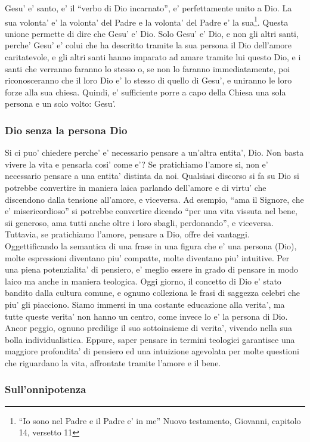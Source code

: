 Gesu' e' santo, e' il ``verbo di Dio incarnato'', e' perfettamente unito a Dio. La sua volonta' e' la volonta' del Padre e la volonta' del Padre e' la sua\footnote{``Io sono nel Padre e il Padre e' in me'' Nuovo testamento, Giovanni, capitolo 14, versetto 11}. Questa unione permette di dire che Gesu' e' Dio. Solo Gesu' e' Dio, e non gli altri santi, perche' Gesu' e' colui che ha descritto tramite la sua persona il Dio dell'amore caritatevole, e gli altri santi hanno imparato ad amare tramite lui questo Dio, e i santi che verranno faranno lo stesso o, se non lo faranno immediatamente, poi riconosceranno che il loro Dio e' lo stesso di quello di Gesu', e uniranno le loro forze alla sua chiesa. Quindi, e' sufficiente porre a capo della Chiesa una sola persona e un solo volto: Gesu'.

\subsubsection{Dio senza la persona Dio}
Si ci puo' chiedere perche' e' necessario pensare a un'altra entita', Dio. Non basta vivere la vita e pensarla cosi' come e'?
Se pratichiamo l'amore si, non e' necessario pensare a una entita' distinta da noi. Qualsiasi discorso si fa su Dio si potrebbe convertire in maniera laica parlando dell'amore e di virtu' che discendono dalla tensione all'amore, e viceversa. Ad esempio, ``ama il Signore, che e' misericordioso'' si potrebbe convertire dicendo ``per una vita vissuta nel bene, sii generoso, ama tutti anche oltre i loro sbagli, perdonando'', e viceversa.
Tuttavia, se pratichiamo l'amore, pensare a Dio, offre dei vantaggi. Oggettificando la semantica di una frase in una figura che e' una persona (Dio), molte espressioni diventano piu' compatte, molte diventano piu' intuitive. Per una piena potenzialita' di pensiero, e' meglio essere in grado di pensare in modo laico ma anche in maniera teologica. Oggi giorno, il concetto di Dio e' stato bandito dalla cultura comune, e ognuno colleziona le frasi di saggezza celebri che piu' gli piacciono. Siamo immersi in una costante educazione alla verita', ma tutte queste verita' non hanno un centro, come invece lo e' la persona di Dio. Ancor peggio, ognuno predilige il suo sottoinsieme di verita', vivendo nella sua bolla individualistica. Eppure, saper pensare in termini teologici garantisce una maggiore profondita' di pensiero ed una intuizione agevolata per molte questioni che riguardano la vita, affrontate tramite l'amore e il bene.

\subsubsection{Sull'onnipotenza}

